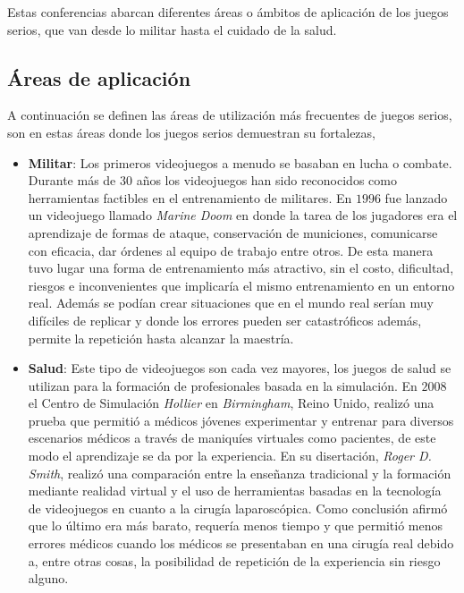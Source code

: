 Estas conferencias abarcan diferentes áreas o ámbitos de aplicación de los
juegos serios, que van desde lo militar hasta el cuidado de la salud.

\subsection{Áreas de aplicación}
\label{sec:areas_aplicacion}

A continuación se definen las áreas de utilización  más frecuentes de juegos serios, son en 
estas áreas donde los juegos serios demuestran su fortalezas,

\begin{itemize}

\item \textbf{Militar}: Los primeros videojuegos a menudo se basaban en lucha o
    combate. Durante más de $30$ años los videojuegos han sido reconocidos como
    herramientas factibles en el entrenamiento de militares. En $1996$ fue
    lanzado un videojuego llamado \emph{Marine Doom} en donde la tarea de los
    jugadores era el aprendizaje de formas de ataque, conservación de
    municiones, comunicarse con eficacia, dar órdenes al equipo de trabajo entre
    otros. De esta manera tuvo lugar una forma de entrenamiento más atractivo,
    sin el costo, dificultad, riesgos e inconvenientes que implicaría el mismo
    entrenamiento en un entorno real. Además se podían crear situaciones que en
    el mundo real serían muy difíciles de replicar y donde los errores pueden
    ser catastróficos además, permite la repetición hasta alcanzar la
    maestría\cite{education:games}.

\item \textbf{Salud}: Este tipo de videojuegos son cada vez mayores, los juegos
    de salud se utilizan para la formación de profesionales basada en la
    simulación. En $2008$ el Centro de Simulación \emph{Hollier} en
    \emph{Birmingham}, Reino Unido, realizó una prueba que permitió a médicos
    jóvenes experimentar y entrenar para diversos escenarios médicos a través de
    maniquíes virtuales como pacientes, de este modo el aprendizaje se da por la
    experiencia. En su disertación, \emph{Roger D. Smith}, realizó una comparación
    entre la enseñanza tradicional y la formación mediante realidad virtual y el
    uso de herramientas basadas en la tecnología de videojuegos en cuanto a la
    cirugía laparoscópica. Como conclusión afirmó que lo último era más barato,
    requería menos tiempo y que permitió menos errores médicos cuando los
    médicos se presentaban en una cirugía real debido a, entre otras cosas, la
    posibilidad de repetición de la experiencia sin riesgo
    alguno\cite{education:games}. 


\end{itemize}
